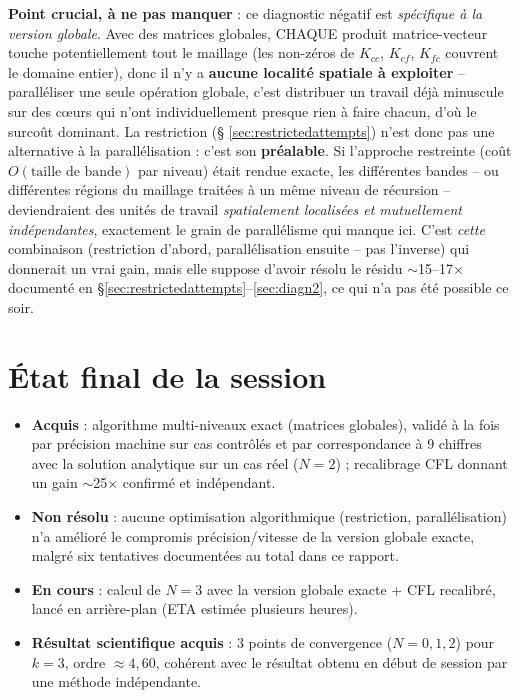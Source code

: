 \documentclass[11pt]{article}
\begin{document}
\textbf{Point crucial, à ne pas manquer} : ce diagnostic négatif est
\emph{spécifique à la version globale}. Avec des matrices globales,
CHAQUE produit matrice-vecteur touche potentiellement tout le maillage
(les non-zéros de $K_{cc}$, $K_{cf}$, $K_{fc}$ couvrent le domaine
entier), donc il n'y a \textbf{aucune localité spatiale à exploiter} --
paralléliser une seule opération globale, c'est distribuer un travail
déjà minuscule sur des cœurs qui n'ont individuellement presque rien à
faire chacun, d'où le surcoût dominant. La restriction (\S
\ref{sec:restrictedattempts}) n'est donc pas une alternative à la
parallélisation : c'est son \textbf{préalable}. Si l'approche restreinte
(coût $O(\text{taille de bande})$ par niveau) était rendue exacte, les
différentes bandes -- ou différentes régions du maillage traitées à un
même niveau de récursion -- deviendraient des unités de travail
\emph{spatialement localisées et mutuellement indépendantes}, exactement
le grain de parallélisme qui manque ici. C'est \emph{cette}
combinaison (restriction d'abord, parallélisation ensuite -- pas
l'inverse) qui donnerait un vrai gain, mais elle suppose d'avoir
résolu le résidu $\sim$15--17$\times$ documenté en
\S\ref{sec:restrictedattempts}--\ref{sec:diagn2}, ce qui n'a pas été
possible ce soir.

\section{État final de la session}

\begin{itemize}
  \item \textbf{Acquis} : algorithme multi-niveaux exact (matrices
  globales), validé à la fois par précision machine sur cas contrôlés
  et par correspondance à 9 chiffres avec la solution analytique sur un
  cas réel ($N=2$) ; recalibrage CFL donnant un gain $\sim$25$\times$
  confirmé et indépendant.
  \item \textbf{Non résolu} : aucune optimisation algorithmique
  (restriction, parallélisation) n'a amélioré le compromis
  précision/vitesse de la version globale exacte, malgré six tentatives
  documentées au total dans ce rapport.
  \item \textbf{En cours} : calcul de $N=3$ avec la version globale
  exacte + CFL recalibré, lancé en arrière-plan (ETA estimée plusieurs
  heures).
  \item \textbf{Résultat scientifique acquis} : 3 points de convergence
  ($N=0,1,2$) pour $k=3$, ordre $\approx4{,}60$, cohérent avec le
  résultat obtenu en début de session par une méthode indépendante.
\end{itemize}
\end{document}
